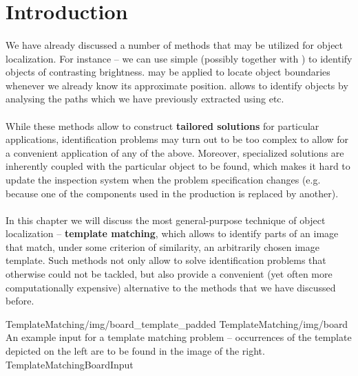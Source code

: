 \section{Introduction}

\paragraph*{}
We have already discussed a number of methods that may be utilized for object localization. For instance -- we can use simple  (possibly together with ) to identify objects of contrasting brightness.  may be applied to locate object boundaries whenever we already know its approximate position.  allows to identify objects by analysing the paths which we have previously extracted using  etc.

\paragraph*{}
While these methods allow to construct \textbf{tailored solutions} for particular applications, identification problems may turn out to be too complex to allow for a convenient application of any of the above. Moreover, specialized solutions are inherently coupled with the particular object to be found, which makes it hard to update the inspection system when the problem specification changes (e.g. because one of the components used in the production is replaced by another).

\paragraph*{}
In this chapter we will discuss the most general-purpose technique of object localization -- \textbf{template matching}, which allows to identify parts of an image that match, under some criterion of similarity, an arbitrarily chosen image template. Such methods not only allow to solve identification problems that otherwise could not be tackled, but also provide a convenient (yet often more computationally expensive) alternative to the methods that we have discussed before. 

\twoFigures
{TemplateMatching/img/board_template_padded}
{TemplateMatching/img/board}
{An example input for a template matching problem -- occurrences of the template depicted on the left are to be found in the image of the right.}
{TemplateMatchingBoardInput}
{\basicWidth}

